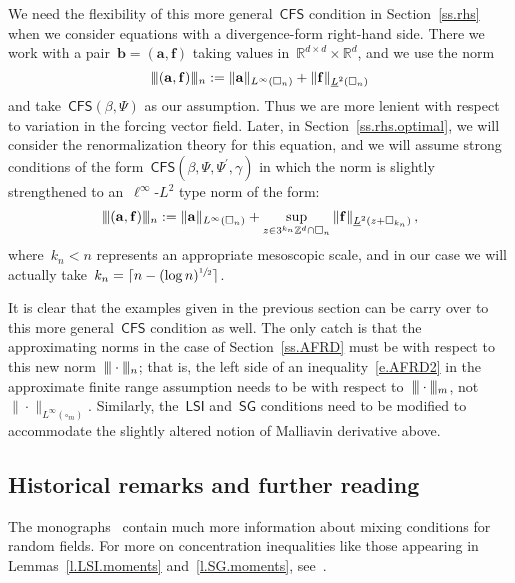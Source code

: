 \documentclass[11pt]{article} %
\let\oldsquare\square %
\renewcommand{\square}{\oldsquare}
\numberwithin{equation}{section}
\theoremstyle{definition}
\newcommand{\vertiii}{\vert\kern-0.3ex\vert\kern-0.25ex\vert}
\newcommand*{\R}{\ensuremath{\mathbb{R}}}
\newcommand*{\Zd}{\ensuremath{\mathbb{Z}^d}}
\newcommand*{\Rd}{\ensuremath{\mathbb{R}^d}}
\renewcommand{\b}{\ensuremath{\mathbf{b}}}
\newcommand{\f}{\mathbf{f}}
\renewcommand{\a}{\mathbf{a}}
\newcommand{\cu}{\square}
\newcommand{\CFS}{\mathsf{CFS}}
\newcommand{\LSI}{\mathsf{LSI}}
\newcommand{\SG}{\mathsf{SG}}
\begin{document}
We need the flexibility of this more general~$\CFS$ condition  in Section~\ref{ss.rhs} when we consider equations with a divergence-form right-hand side. There we work with a pair~$\b = (\a,\f)$ taking values in~$\R^{d\times d} \times \Rd$, and we use the norm
\begin{equation}
\label{e.triple.norm.sec6}
\vertiii (\a,\f) \vertiii_n:= \| \a \|_{L^\infty(\cu_n)} + \| \f \|_{\underline{L}^2(\cu_n)}
\end{equation}
and take~$\CFS(\beta,\Psi)$ as our assumption. Thus we are more lenient with respect to variation in the forcing vector field. 
Later, in Section~\ref{ss.rhs.optimal}, we will consider the renormalization theory for this equation, and we will assume strong conditions of the form~$\CFS(\beta,\Psi,\Psi^\prime,\gamma)$ in which the norm is slightly strengthened to an~$\ell^\infty$-$L^2$ type norm of the form:
\begin{equation}
\label{e.triple.your.bar.meso}
\vertiii (\a,\f) \vertiii_n:= \| \a \|_{L^\infty(\cu_n)} 
+
\sup_{z\in 3^{k_n} \Zd \cap \cu_n}
\| \f \|_{\underline{L}^2(z+\cu_{k_n})}
\,,
\end{equation}
where~$k_n < n$ represents an appropriate mesoscopic scale, and in our case we will actually take~$k_n =  \lceil n - (\log n)^{\sfrac12} \rceil$.

\smallskip

It is clear that the examples given in the previous section can be carry over to this more general~$\CFS$ condition as well. The only catch is that the approximating norms in the case of Section~\ref{ss.AFRD} must be with respect to this new norm~$\vertiii \cdot \vertiii_n$; that is, the left side of an inequality~\eqref{e.AFRD2} in the approximate finite range assumption needs to be with respect to~$\vertiii \cdot \vertiii_m$, not~$\| \cdot\|_{L^\infty(\cu_m)}$. Similarly, the~$\LSI$ and~$\SG$ conditions need to be modified to accommodate the slightly altered notion of Malliavin derivative above. 

\subsection*{Historical remarks and further reading}


The monographs~\cite{Brad,B1,Torq} contain much more information about mixing conditions for random fields. For more on concentration inequalities like those appearing in Lemmas~\ref{l.LSI.moments} and~\ref{l.SG.moments}, see~\cite{BLM}. 
\end{document}
